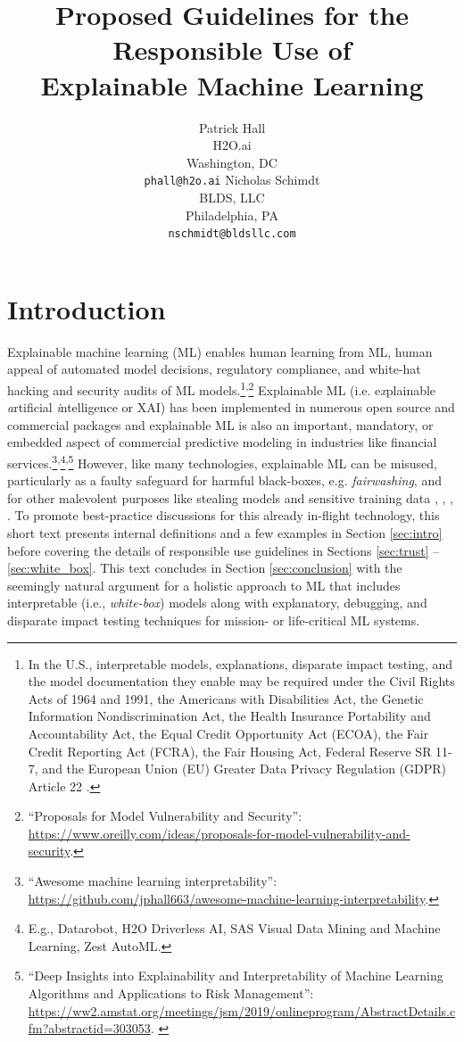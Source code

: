 \documentclass{article}
\title{Proposed Guidelines for the Responsible Use of\\ Explainable Machine Learning}
\author{Patrick Hall\\
H2O.ai\\
Washington, DC\\
\texttt{phall@h2o.ai} \And
Nicholas Schimdt\\
BLDS, LLC\\
Philadelphia, PA\\
\texttt{nschmidt@bldsllc.com}
}
\begin{document}
\maketitle

\section{Introduction}

Explainable machine learning (ML) enables human learning from ML, human appeal of automated model decisions, regulatory compliance, and white-hat hacking and security audits of ML models.\footnote{In the U.S., interpretable models, explanations, disparate impact testing, and the model documentation they enable may be required under the Civil Rights Acts of 1964 and 1991, the Americans with Disabilities Act, the Genetic Information Nondiscrimination Act, the Health Insurance Portability and Accountability Act, the Equal Credit Opportunity Act (ECOA), the Fair Credit Reporting Act (FCRA), the Fair Housing Act, Federal Reserve SR 11-7, and the European Union (EU) Greater Data Privacy Regulation (GDPR) Article 22 \cite{ff_interpretability}.\label{fn:regs}}\textsuperscript{,}\footnote{``Proposals for Model Vulnerability and Security'': \url{https://www.oreilly.com/ideas/proposals-for-model-vulnerability-and-security}.} Explainable ML (i.e. e\textit{x}plainable \textit{a}rtificial \textit{i}ntelligence or XAI) has been implemented in numerous open source and commercial packages and explainable ML is also an important, mandatory, or embedded aspect of commercial predictive modeling in industries like financial services.\footnote{``Awesome machine learning interpretability'': \url{https://github.com/jphall663/awesome-machine-learning-interpretability}.}\textsuperscript{,}\footnote{E.g.,  Datarobot, H2O Driverless AI, SAS Visual Data Mining and Machine Learning, Zest AutoML.}\textsuperscript{,}\footnote{``Deep Insights into Explainability and Interpretability of Machine Learning Algorithms and Applications to Risk Management'': \url{https://ww2.amstat.org/meetings/jsm/2019/onlineprogram/AbstractDetails.cfm?abstractid=303053}. \label{fn:chen}} However, like many technologies, explainable ML can be misused, particularly as a faulty safeguard for harmful black-boxes, e.g. \textit{fairwashing}, and for other malevolent purposes like stealing models and sensitive training data \cite{fair_washing}, \cite{please_stop}, \cite{membership_inference}, \cite{model_stealing}. To promote best-practice discussions for this already in-flight technology, this short text presents internal definitions and a few examples in Section \ref{sec:intro} before covering the details of responsible use guidelines in Sections \ref{sec:trust} -- \ref{sec:white_box}. This text concludes in Section \ref{sec:conclusion} with the seemingly natural argument for a holistic approach to ML that includes interpretable (i.e., \textit{white-box}) models along with explanatory, debugging, and disparate impact testing techniques for mission- or life-critical ML systems.
\end{document}
